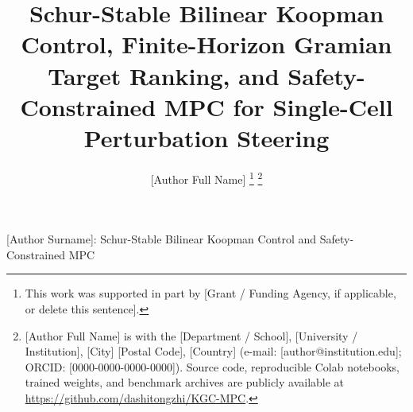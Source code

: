 \documentclass[journal]{IEEEtran}
\begin{document}
\title{Schur-Stable Bilinear Koopman Control, Finite-Horizon Gramian Target Ranking, and Safety-Constrained MPC for Single-Cell Perturbation Steering}

\author{[Author Full Name]%
\thanks{This work was supported in part by [Grant / Funding Agency, if applicable, or delete this sentence].}%
\thanks{[Author Full Name] is with the [Department / School], [University / Institution], [City] [Postal Code], [Country] (e-mail: [author@institution.edu]; ORCID: [0000-0000-0000-0000]). Source code, reproducible Colab notebooks, trained weights, and benchmark archives are publicly available at \url{https://github.com/dashitongzhi/KGC-MPC}.}}

%
{[Author Surname]: Schur-Stable Bilinear Koopman Control and Safety-Constrained MPC}

\maketitle
\end{document}
